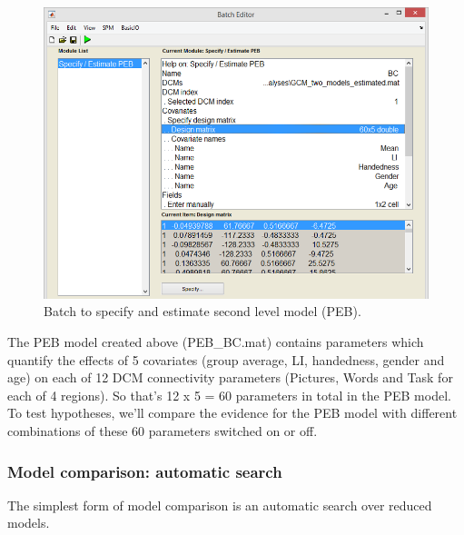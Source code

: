 \documentclass{article}
\begin{document}
\begin{figure}[ht]
\begin{center}
\includegraphics{"Fig_batch_specify_peb"}
\caption{Batch to specify and estimate second level model (PEB). \label{Fig_batch_specify_peb}}
\end{center}
\end{figure}

The PEB model created above (PEB\_BC.mat) contains parameters which quantify the effects of 5 covariates (group average, LI, handedness, gender and age) on each of 12 DCM connectivity parameters (Pictures, Words and Task for each of 4 regions). So that's 12 x 5 = 60 parameters in total in the PEB model. To test hypotheses, we'll compare the evidence for the PEB model with different combinations of these 60 parameters switched on or off.

\subsubsection{Model comparison: automatic search} \label{GUI_search}

The simplest form of model comparison is an automatic search over reduced models.
\end{document}
